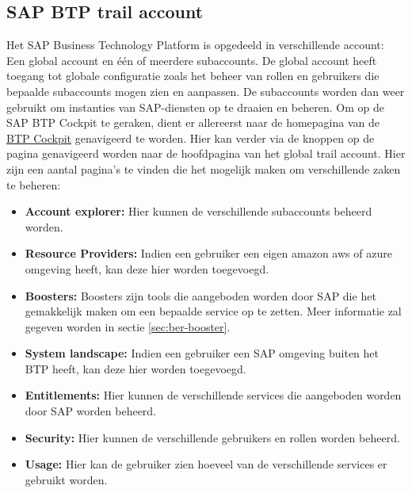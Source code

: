 \subsection{SAP BTP trail account}

Het SAP Business Technology Platform is opgedeeld in verschillende account: Een global account en één of meerdere subaccounts. De global account heeft toegang tot globale configuratie zoals het beheer van rollen en gebruikers die bepaalde subaccounts mogen zien en aanpassen. De subaccounts worden dan weer gebruikt om instanties van SAP-diensten op te draaien en beheren. Om op de SAP BTP Cockpit te geraken, dient er allereerst naar de homepagina van de \href{https://account.hana.ondemand.com/cockpit#/home/allaccounts}{BTP Cockpit} genavigeerd te worden. Hier kan verder via de knoppen op de pagina genavigeerd worden naar de hoofdpagina van het global trail account. Hier zijn een aantal pagina's te vinden die het mogelijk maken om verschillende zaken te beheren:
\begin{itemize}
    \item \textbf{Account explorer:} Hier kunnen de verschillende subaccounts beheerd worden.
    \item \textbf{Resource Providers:} Indien een gebruiker een eigen amazon aws of azure omgeving heeft, kan deze hier worden toegevoegd.
    \item \textbf{Boosters:} Boosters zijn tools die aangeboden worden door SAP die het gemakkelijk maken om een bepaalde service op te zetten. Meer informatie zal gegeven worden in sectie \ref{sec:ber-booster}.
    \item \textbf{System landscape:} Indien een gebruiker een SAP omgeving buiten het BTP heeft, kan deze hier worden toegevoegd.
    \item \textbf{Entitlements:} Hier kunnen de verschillende services die aangeboden worden door SAP worden beheerd.
    \item \textbf{Security:} Hier kunnen de verschillende gebruikers en rollen worden beheerd.
    \item \textbf{Usage: } Hier kan de gebruiker zien hoeveel van de verschillende services er gebruikt worden.
\end{itemize}

